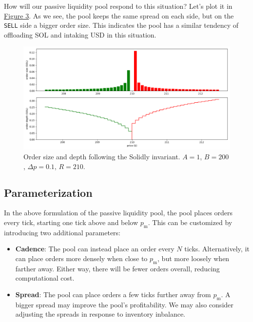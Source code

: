 \documentclass{article}
\begin{document}
How will our passive liquidity pool respond to this situation? Let's plot it in \hyperref[fig:3]{Figure 3}. As we see, the pool keeps the same spread on each side, but on the \texttt{SELL} side a bigger order size. This indicates the pool has a similar tendency of offloading SOL and intaking USD in this situation.

\begin{figure}
  \centering
  \includegraphics[width=\textwidth]{3-solidly-price-jump.png}
  \caption{Order size and depth following the Solidly invariant. $A = 1$, $B = 200$, $\Delta p = 0.1$, $R = 210$.}
  \label{fig:3}
\end{figure}

\subsection{Parameterization}

In the above formulation of the passive liquidity pool, the pool places orders every tick, starting one tick above and below $p_{\mathrm{m}}$. This can be customized by introducing two additional parameters:

\begin{itemize}
  \item \textbf{Cadence}: The pool can instead place an order every $N$ ticks. Alternatively, it can place orders more densely when close to $p_{\mathrm{m}}$, but more loosely when farther away. Either way, there will be fewer orders overall, reducing computational cost.
  \item \textbf{Spread}: The pool can place orders a few ticks further away from $p_{\mathrm{m}}$. A bigger spread may improve the pool's profitability. We may also consider adjusting the spreads in response to inventory inbalance.\supercite{avellanedastoikov}
\end{itemize}
\end{document}
